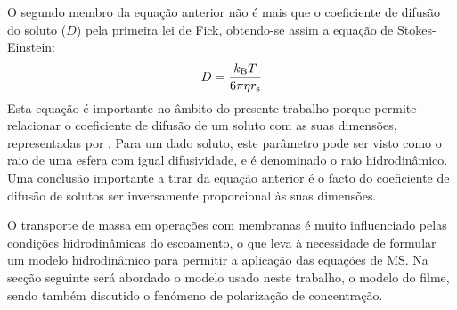 O segundo membro da equação anterior não é mais que o coeficiente de difusão do soluto ($D$) pela primeira lei de Fick, obtendo-se assim a equação de Stokes-Einstein:
\begin{equation}
	\label{eq:stokesein}
	D=\frac{k_{\mathrm{B}} T}{6\pi\eta r_{\mathrm{s}}}
\end{equation}
Esta equação é importante no âmbito do presente trabalho porque permite relacionar o coeficiente de difusão de um soluto com as suas dimensões, representadas por \raiostokes. 
Para um dado soluto, este parâmetro pode ser visto como o raio de uma esfera com igual difusividade, e é denominado o raio hidrodinâmico. Uma conclusão importante a tirar da equação anterior é o facto do coeficiente de difusão de solutos ser inversamente proporcional às suas dimensões. 

O transporte de massa em operações com membranas é muito influenciado pelas condições hidrodinâmicas do escoamento, o que leva à necessidade de formular um modelo hidrodinâmico para permitir a aplicação das equações de MS. Na secção seguinte será abordado o modelo usado neste trabalho, o modelo do filme, sendo também discutido o fenómeno de polarização de concentração.  

